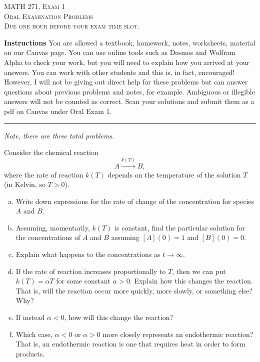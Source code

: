 \documentclass[12pt]{amsbook}
\begin{document}

\begin{center}
   \textsc{\large MATH 271, Exam 1}\\
   \textsc{Oral Examination Problems}\\
   \textsc{Due one hour before your exam time slot.}
\end{center}

\vspace{1cm}

\noindent\textbf{Instructions} \; You are allowed a textbook, homework, notes, worksheets, material on our Canvas page.  You can use online tools such as Desmos and Wolfram Alpha to check your work, but you will need to explain how you arrived at your answers.  You can work with other students and this is, in fact, encouraged! However, I will not be giving out direct help for these problems but can answer questions about previous problems and notes, for example. Ambiguous or illegible answers will not be counted as correct. Scan your solutions and submit them as a pdf on Canvas under Oral Exam 1.


\vspace{1cm}


\hrule

\vspace*{1cm}
\noindent\emph{Note, there are three total problems.}

\newpage

\begin{problem}
Consider the chemical reaction
\[
A\xrightarrow{k(T)} B,
\]
where the rate of reaction $k(T)$ depends on the temperature of the solution $T$ (in Kelvin, so $T>0$).
\begin{enumerate}[(a)]
    \item Write down expressions for the rate of change of the concentration for species $A$ and $B$.
    \item Assuming, momentarily, $k(T)$ is constant, find the particular solution for the concentrations of $A$ and $B$ assuming $[A](0)=1$ and $[B](0)=0$.
    \item Explain what happens to the concentrations as $t\to \infty$.
    \item If the rate of reaction increases proportionally to $T$, then we can put $k(T)=\alpha T$ for some constant $\alpha>0$.  Explain how this changes the reaction.  That is, will the reaction occur more quickly,  more slowly, or something else? Why?
    \item If instead $\alpha<0$, how will this change the reaction?
    \item Which case, $\alpha<0$ or $\alpha>0$ more closely represents an endothermic reaction? That is, an endothermic reaction is one that requires heat in order to form products.
\end{enumerate}
\end{problem}
\end{document}
